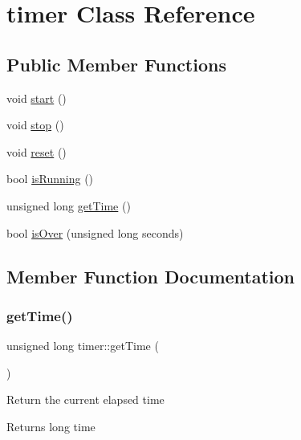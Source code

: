 \hypertarget{classtimer}{}\section{timer Class Reference}
\label{classtimer}
\subsection*{Public Member Functions}
\begin{DoxyCompactItemize}
\item 
void \mbox{\hyperlink{classtimer_a9aa894a57748b2bdf3adce46f5736794}{start}} ()
\item 
void \mbox{\hyperlink{classtimer_a3218d61649e284071544b17c8c915ecc}{stop}} ()
\item 
void \mbox{\hyperlink{classtimer_a66fc54d1f33bd9d4bec5f8d563595c2e}{reset}} ()
\item 
bool \mbox{\hyperlink{classtimer_a8dae71cac9d8c9e07364793e9f7dfa18}{is\+Running}} ()
\item 
unsigned long \mbox{\hyperlink{classtimer_af30bfcacb583e8501dbd7ca6b1f4d257}{get\+Time}} ()
\item 
bool \mbox{\hyperlink{classtimer_aeccf7b140938ea99dc9860146aa28897}{is\+Over}} (unsigned long seconds)
\end{DoxyCompactItemize}


\subsection{Member Function Documentation}
\mbox{\label{classtimer_af30bfcacb583e8501dbd7ca6b1f4d257}} 
\subsubsection{\texorpdfstring{getTime()}{getTime()}}
{\footnotesize\ttfamily unsigned long timer\+::get\+Time (\begin{DoxyParamCaption}{ }\end{DoxyParamCaption})}

Return the current elapsed time \begin{DoxyReturn}{Returns}
long time 
\end{DoxyReturn}
\mbox{\label{classtimer_aeccf7b140938ea99dc9860146aa28897}} 

